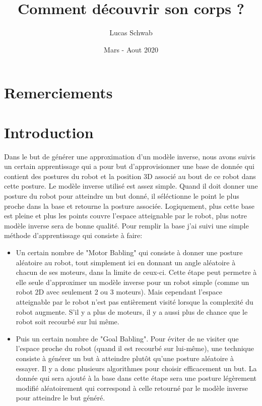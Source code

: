 \documentclass{article}
\title{Comment découvrir son corps ?}
\author{Lucas Schwab}
\date{Mars - Aout 2020}
\begin{document}
\maketitle

\tableofcontents

\section*{Remerciements}

\section*{Introduction}

Dans le but de générer une approximation d'un modèle inverse, nous avons suivis un certain apprentissage qui a pour but d'approvisionner une base de donnée qui contient des postures du robot et la position 3D associé au bout de ce robot dans cette posture. Le modèle inverse utilisé est assez simple. Quand il doit donner une posture du robot pour atteindre un but donné, il séléctionne le point le plus proche dans la base et retourne la posture associée. Logiquement, plus cette base est pleine et plus les points couvre l'espace atteignable par le robot, plus notre modèle inverse sera de bonne qualité. Pour remplir la base j'ai suivi une simple méthode d'apprentissage qui consiste à faire:
\begin{itemize}
    \item Un certain nombre de "Motor Babling" qui consiste à donner une posture aléatoire au robot, tout simplement ici en donnant un angle aléatoire à chacun de ses moteurs, dans la limite de ceux-ci. Cette étape peut permetre à elle seule d'approximer un modèle inverse pour un robot simple (comme un robot 2D avec seulement 2 ou 3 moteurs). Mais cependant l'espace atteignable par le robot n'est pas entièrement visité lorsque la complexité du robot augmente. S'il y a plus de moteurs, il y a aussi plus de chance que le robot soit recourbé sur lui même.
    \item Puis un certain nombre de "Goal Babling". Pour éviter de ne visiter que l'espace proche du robot (quand il est recourbé sur lui-même), une technique consiste à générer un but à atteindre plutôt qu'une posture aléatoire à essayer. Il y a donc plusieurs algorithmes pour choisir efficacement un but. La donnée qui sera ajouté à la base dans cette étape sera une posture légèrement modifié aléatoirement qui correspond à celle retourné par le modèle inverse pour atteindre le but généré.
\end{itemize}
\end{document}
